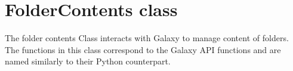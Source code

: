 \hypertarget{group__folder__contents__class}{}\section{Folder\+Contents class}
\label{group__folder__contents__class}
The folder contents Class interacts with Galaxy to manage content of folders. The functions in this class correspond to the Galaxy A\+PI functions and are named similarly to their Python counterpart. 